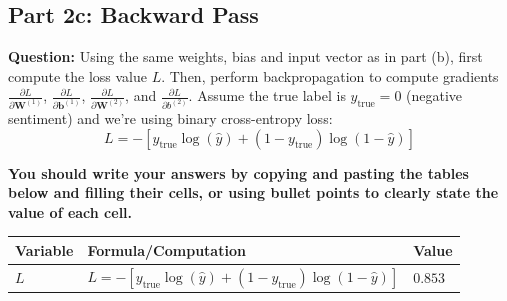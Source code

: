 \documentclass{article}
\theoremstyle{case}
\theoremstyle{definition}
\newcommand{\mysolution}[1]{\noindent{\begin{shaded}\textbf{Your Solution:}\ #1 \end{shaded}}}
\begin{document}
\mysolution{}

\subsection*{Part 2c: Backward Pass}

\textbf{Question:} Using the same weights, bias and input vector as in part (b), first compute the loss value $L$. Then, perform backpropagation to compute gradients $\frac{\partial L}{\partial \mathbf{W}^{(1)}}$, $\frac{\partial L}{\partial \mathbf{b}^{(1)}}$, $\frac{\partial L}{\partial \mathbf{W}^{(2)}}$, and $\frac{\partial L}{\partial b^{(2)}}$. Assume the true label is $y_{\text{true}} = 0$ (negative sentiment) and we're using binary cross-entropy loss:
$$L = -[y_{\text{true}} \log(\hat{y}) + (1 - y_{\text{true}}) \log(1 - \hat{y})]$$

\textbf{You should write your answers by copying and pasting the tables below and filling their cells, or using bullet points to clearly state the value of each cell.}

\begin{table}[h]
\centering
\begin{tabular}{|l|l|l|}
\hline
Variable & Formula/Computation & Value \\
\hline
$L$ &$L = -[y_{\text{true}} \log(\hat{y}) + (1 - y_{\text{true}}) \log(1 - \hat{y})]$ & $0.853$\\
\hline
\end{tabular}
\end{table}
\end{document}
